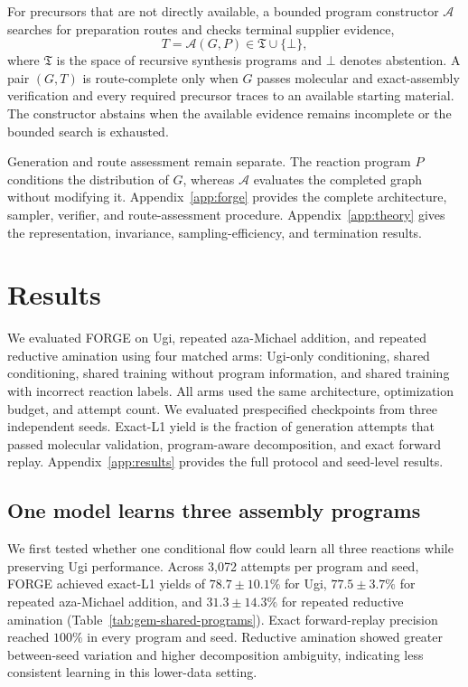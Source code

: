 \documentclass{article}
\begin{document}
For precursors that are not directly available, a bounded program constructor $\mathcal{A}$ searches for preparation routes and checks terminal supplier evidence,
\begin{equation}
    T=\mathcal{A}(G,P)
    \in
    \mathfrak{T}\cup\{\bot\},
\end{equation}
where $\mathfrak{T}$ is the space of recursive synthesis programs and $\bot$ denotes abstention. A pair $(G,T)$ is route-complete only when $G$ passes molecular and exact-assembly verification and every required precursor traces to an available starting material. The constructor abstains when the available evidence remains incomplete or the bounded search is exhausted.

Generation and route assessment remain separate. The reaction program $P$ conditions the distribution of $G$, whereas $\mathcal{A}$ evaluates the completed graph without modifying it. Appendix~\ref{app:forge} provides the complete architecture, sampler, verifier, and route-assessment procedure. Appendix~\ref{app:theory} gives the representation, invariance, sampling-efficiency, and termination results.

\section{Results}

We evaluated FORGE on Ugi, repeated aza-Michael addition, and repeated reductive amination using four matched arms: Ugi-only conditioning, shared conditioning, shared training without program information, and shared training with incorrect reaction labels. All arms used the same architecture, optimization budget, and attempt count. We evaluated prespecified checkpoints from three independent seeds. Exact-L1 yield is the fraction of generation attempts that passed molecular validation, program-aware decomposition, and exact forward replay. Appendix~\ref{app:results} provides the full protocol and seed-level results.

\subsection{One model learns three assembly programs}

We first tested whether one conditional flow could learn all three reactions while preserving Ugi performance. Across 3,072 attempts per program and seed, FORGE achieved exact-L1 yields of $78.7\pm10.1\%$ for Ugi, $77.5\pm3.7\%$ for repeated aza-Michael addition, and $31.3\pm14.3\%$ for repeated reductive amination (Table~\ref{tab:gem-shared-programs}). Exact forward-replay precision reached $100\%$ in every program and seed. Reductive amination showed greater between-seed variation and higher decomposition ambiguity, indicating less consistent learning in this lower-data setting.
\end{document}
